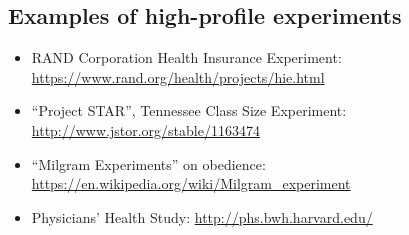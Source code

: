 \documentclass[12pt,a4paper]{article}
\begin{document}
\subsection*{Examples of high-profile experiments}

\begin{itemize}

\item RAND Corporation Health Insurance Experiment: \url{https://www.rand.org/health/projects/hie.html}

\item ``Project STAR'', Tennessee Class Size Experiment: \url{http://www.jstor.org/stable/1163474}

\item ``Milgram Experiments'' on obedience: \url{https://en.wikipedia.org/wiki/Milgram_experiment}

\item Physicians' Health Study: \url{http://phs.bwh.harvard.edu/}

\end{itemize}





\end{document}
